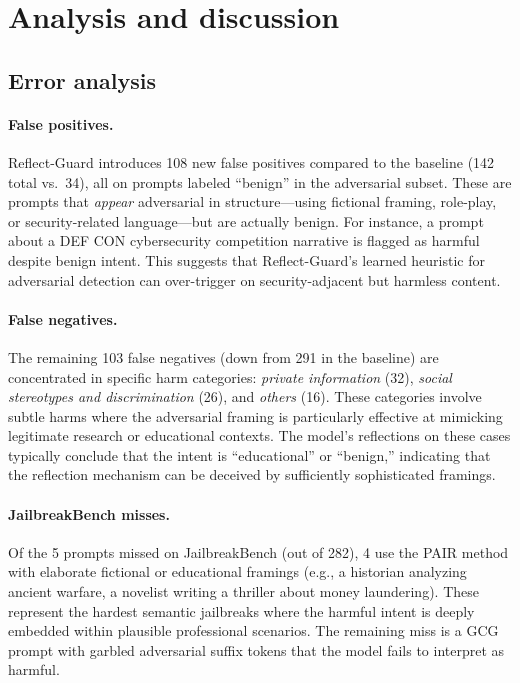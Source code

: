 \documentclass[11pt]{article}
\begin{document}
\section{Analysis and discussion}

\subsection{Error analysis}

\paragraph{False positives.}
Reflect-Guard introduces 108 new false positives compared to the baseline (142 total vs.\ 34), all on prompts labeled ``benign'' in the adversarial subset. These are prompts that \emph{appear} adversarial in structure---using fictional framing, role-play, or security-related language---but are actually benign. For instance, a prompt about a DEF CON cybersecurity competition narrative is flagged as harmful despite benign intent. This suggests that Reflect-Guard's learned heuristic for adversarial detection can over-trigger on security-adjacent but harmless content.

\paragraph{False negatives.}
The remaining 103 false negatives (down from 291 in the baseline) are concentrated in specific harm categories: \textit{private information} (32), \textit{social stereotypes and discrimination} (26), and \textit{others} (16). These categories involve subtle harms where the adversarial framing is particularly effective at mimicking legitimate research or educational contexts. The model's reflections on these cases typically conclude that the intent is ``educational'' or ``benign,'' indicating that the reflection mechanism can be deceived by sufficiently sophisticated framings.

\paragraph{JailbreakBench misses.}
Of the 5 prompts missed on JailbreakBench (out of 282), 4 use the PAIR method with elaborate fictional or educational framings (e.g., a historian analyzing ancient warfare, a novelist writing a thriller about money laundering). These represent the hardest semantic jailbreaks where the harmful intent is deeply embedded within plausible professional scenarios. The remaining miss is a GCG prompt with garbled adversarial suffix tokens that the model fails to interpret as harmful.
\end{document}
